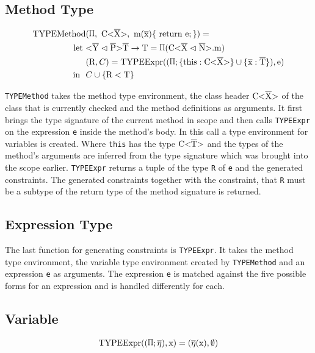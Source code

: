 \subsection{Method Type}

\begin{align*}
    \text{TYPEMethod}&(\sprod{0.7}, \ \text{C<} \ot{X} \text{>}, \ \text{m} ( \ot{x} ) \{ \ \text{return e}; \} ) = \\
    \text{let} \ &\yp \oto{\text{T}} = \sprod{0.7} ( \cm ) \\
    & ( \text{R}, C ) = \text{TYPEExpr} (( \sprod{0.7}; \{ \text{this} : \text{C<} \ot{X} \text{>} \} \cup \{ \ot{x} : \ot{T} \} ) , \text{e} ) \\
    \text{in} \ \  & C \cup \{ \text{R} < \text{T} \}\\
\end{align*}

\verb|TYPEMethod| takes the method type environment, the class header $\text{C<}\overline{\text{X}}\text{>}$ of the class that is currently checked and the method definitions as arguments.
It first brings the type signature of the current method in scope and then calls \verb|TYPEExpr| on the expression \verb|e| inside the method's body. In this call a type environment for variables is created. Where \verb|this| has the type $\text{C<}\overline{\text{T}}\text{>}$ and the types of the method's arguments are inferred from the type signature which was brought into the scope earlier.
\verb|TYPEExpr| returns a tuple of the type \verb|R| of \verb|e| and the generated constraints. The generated constraints together with the constraint, that \verb|R| must be a subtype of the return type of the method signature is returned.

\subsection{Expression Type}
The last function for generating constraints is \verb|TYPEExpr|. It takes the method type environment, the variable type environment created by \verb|TYPEMethod| and an expression \verb|e| as arguments.
The expression \verb|e| is matched against the five possible forms for an expression and is handled differently for each.

\subsection{Variable}

\begin{align*}
    \texpr{\text{x}} = (\overline{\eta} (\text{x}), \emptyset)\\
\end{align*}

